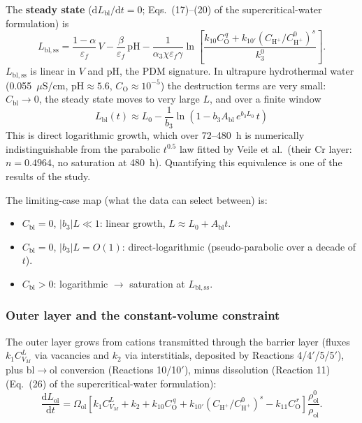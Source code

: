 The \textbf{steady state} ($\mathrm{d}L_{\mathrm{bl}}/\mathrm{d}t = 0$;
Eqs.~(17)--(20) of the supercritical-water formulation) is
\begin{equation}
L_{\mathrm{bl,ss}} = \frac{1-\alpha}{\varepsilon_f}\, V
- \frac{\beta}{\varepsilon_f}\, \mathrm{pH}
- \frac{1}{\alpha_3 \chi \varepsilon_f \gamma}
\ln\!\left[ \frac{ k_{10} C_{\mathrm{O}}^{\,q}
+ k_{10'} \left( C_{\mathrm{H^+}}/C^0_{\mathrm{H^+}} \right)^{s} }{ k_3^{0} } \right] .
\end{equation}
$L_{\mathrm{bl,ss}}$ is linear in $V$ and pH, the PDM signature. In
ultrapure hydrothermal water (0.055~$\mu$S/cm, $\mathrm{pH} \approx 5.6$,
$C_{\mathrm{O}} \approx 10^{-5}$) the destruction terms are very small:
$C_{\mathrm{bl}} \to 0$, the steady state moves to very large $L$, and over a
finite window
\begin{equation}
L_{\mathrm{bl}}(t) \approx L_0 - \frac{1}{b_3}
\ln\!\left( 1 - b_3 A_{\mathrm{bl}}\, e^{b_3 L_0}\, t \right)
\end{equation}
This is direct logarithmic growth, which over 72--480~h is numerically
indistinguishable from the parabolic $t^{0.5}$ law fitted by Veile et al.\
(their Cr layer: $n = 0.4964$, no saturation at 480~h). Quantifying this
equivalence is one of the results of the study.

The limiting-case map (what the data can select between) is:
\begin{itemize}
\item $C_{\mathrm{bl}} = 0$, $|b_3| L \ll 1$: linear growth,
$L \approx L_0 + A_{\mathrm{bl}} t$.
\item $C_{\mathrm{bl}} = 0$, $|b_3| L = O(1)$: direct-logarithmic
(pseudo-parabolic over a decade of $t$).
\item $C_{\mathrm{bl}} > 0$: logarithmic $\to$ saturation at
$L_{\mathrm{bl,ss}}$.
\end{itemize}

\subsubsection{Outer layer and the constant-volume constraint}

The outer layer grows from cations transmitted through the barrier layer
(fluxes $k_1 C_{V_M}^{L}$ via vacancies and $k_2$ via interstitials, deposited
by Reactions 4/4$'$/5/5$'$), plus bl$\to$ol conversion (Reactions 10/10$'$),
minus dissolution (Reaction 11)
(Eq.~(26) of the supercritical-water formulation):
\begin{equation}
\frac{\mathrm{d}L_{\mathrm{ol}}}{\mathrm{d}t}
= \Omega_{\mathrm{ol}} \left[ k_1 C_{V_M}^{L} + k_2
+ k_{10} C_{\mathrm{O}}^{\,q}
+ k_{10'} \left( C_{\mathrm{H^+}}/C^0_{\mathrm{H^+}} \right)^{s}
- k_{11} C_{\mathrm{O}}^{\,r} \right]
\frac{\rho^0_{\mathrm{ol}}}{\rho_{\mathrm{ol}}} .
\label{eq:olode-full}
\end{equation}

